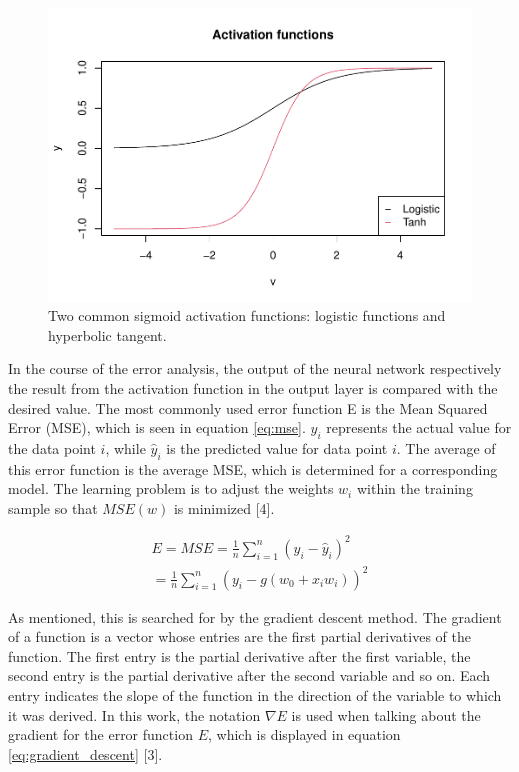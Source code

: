 \documentclass[
]{article}
\begin{document}
\begin{figure}

{\centering \includegraphics[width=0.7\linewidth]{00_main_files/figure-latex/sigmoid-1} 

}

\caption{Two common sigmoid activation functions: logistic functions and hyperbolic tangent.}\label{fig:sigmoid}
\end{figure}

In the course of the error analysis, the output of the neural network
respectively the result from the activation function in the output layer
is compared with the desired value. The most commonly used error
function E is the Mean Squared Error (MSE), which is seen in equation
\ref{eq:mse}. \(y_{i}\) represents the actual value for the data point
\(i\), while \(\hat{y}_{i}\) is the predicted value for data point
\(i\). The average of this error function is the average MSE, which is
determined for a corresponding model. The learning problem is to adjust
the weights \(w_{i}\) within the training sample so that \(MSE(w)\) is
minimized {[}4{]}.

\begin{align} \label{eq:mse}
  E=MSE=\frac{1}{n}\sum_{i = 1}^{n}(y_{i}-\hat{y}_{i})^2 \\
  =\frac{1}{n}\sum_{i = 1}^{n}(y_{i}-g(w_{0}+x_{i}w_{i}))^2 \nonumber
\end{align}

As mentioned, this is searched for by the gradient descent method. The
gradient of a function is a vector whose entries are the first partial
derivatives of the function. The first entry is the partial derivative
after the first variable, the second entry is the partial derivative
after the second variable and so on. Each entry indicates the slope of
the function in the direction of the variable to which it was derived.
In this work, the notation \(\nabla{E}\) is used when talking about the
gradient for the error function \(E\), which is displayed in equation
\ref{eq:gradient_descent} {[}3{]}.
\end{document}
